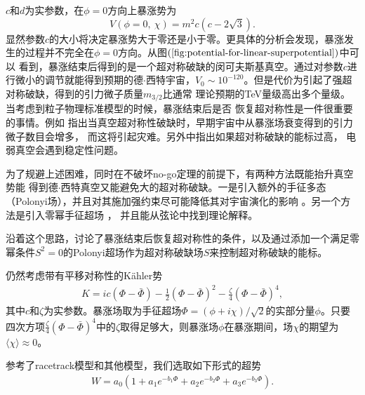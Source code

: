 $c$和$d$为实参数，在$\phi=0$方向上暴涨势为
\begin{equation}
  V(\phi=0,\ \chi)=m^2c(c-2\sqrt{3}).
\end{equation}
显然参数$c$的大小将决定暴涨势大于零还是小于零。更具体的分析会发现，暴涨发生的过程并不完全在$\phi=0$方向。从图$(\ref{fig:potential-for-linear-superpotential})$中可以
看到，暴涨结束后得到的是一个超对称破缺的闵可夫斯基真空。通过对参数$c$进行微小的调节就能得到预期的德$\cdot$西特宇宙，$V_0\sim
10^{-120}$。但是代价为引起了强超对称破缺，得到的引力微子质量$m_{3/2}$比通常
理论预期的TeV量级高出多个量级。当考虑到粒子物理标准模型的时候，暴涨结束后是否
恢复超对称性是一件很重要的事情。例如
\citep{endo2006moduli,nakamura2006gravitino,kawasaki2006gravitino,kawasaki2006gravitino-overproduction,asaka2006gravitinos}
指出当真空超对称性破缺时，早期宇宙中从暴涨场衰变得到的引力微子数目会增多，
而这将引起灾难。另外\citep{degrassi2012higgs}中指出如果超对称破缺的能标过高，
电弱真空会遇到稳定性问题。

为了规避上述困难，同时在不破坏no-go定理的前提下，有两种方法既能抬升真空势能
得到德$\cdot$西特真空又能避免大的超对称破缺。一是引入额外的手征多态
（Polonyi场），并且对其施加强约束尽可能降低其对宇宙演化的影响
\citep{dudas2013strong}。另一个方法是引入零幂手征超场
\citep{ferrara2014cosmology,kallosh2015inflation,dall2014sgoldstino,kallosh2015inflation-de-sitter,linde2015does}，
并且能从弦论中找到理论解释\citep{kallosh2014emergence}。

沿着这个思路，\citep{ketov2016susy}讨论了暴涨结束后恢复超对称性的条件，以及通过添加一个满足零幂条件$S^2=0$的Polonyi超场作为超对称破缺场$S$来控制超对称破缺的能标。


仍然考虑带有平移对称性的K\"ahler势\citep{ketov2016susy}
\begin{align}
    K=ic(\Phi-\bar\Phi)-\frac{1}{2}{(\Phi-\bar\Phi)}^2-\frac{\zeta}{4}{(\Phi-\bar\Phi)}^4,
\end{align}
其中$c$和$\zeta$为实参数。暴涨场取为手征超场$\Phi=(\phi+i\chi)/\sqrt{2}$的实部分量$\phi$。只要四次方项$\frac{\zeta}{4}{(\Phi-\bar\Phi)}^4$中的$\zeta$取得足够大，则暴涨场$\phi$在暴涨期间，场$\chi$的期望为$\langle\chi\rangle\approx0$。

参考了racetrack模型\citep{krasnikov1987supersymmetry,escoda2003saltatory,blanco2005racetrack}和其他模型\citep{ketov2016susy}，我们选取如下形式的超势
\begin{align}
    W=a_0(1+a_1e^{-b_1\Phi}+a_2e^{-b_2\Phi}+a_3e^{-b_3\Phi}).
\end{align}

